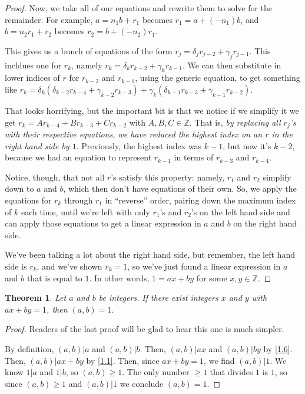\documentclass{article}
\newtheorem{thm}{Theorem}[section]
\numberwithin{equation}{thm}
\begin{document}
\begin{proof}
  Now, we take all of our equations and rewrite them to solve for the remainder. For example, $a = n_1 b + r_1$ becomes $r_1 = a + (-n_1) b$, and $b = n_2 r_1 + r_2$ becomes $r_2 = b + (-n_2) r_1$.

  This gives us a bunch of equations of the form $r_j = \delta_{j} r_{j-2} + \gamma_{j} r_{j-1}$. This incldues one for $r_k$, namely $r_k = \delta_k r_{k-2} + \gamma_k r_{k-1}$.
  We can then substitute in lower indices of $r$ for $r_{k-2}$ and $r_{k-1}$, using the generic equation, to get something like $r_k = \delta_k (\delta_{k-2} r_{k-4} + \gamma_{k-2} r_{k-3}) + \gamma_k (\delta_{k-1} r_{k-3} + \gamma_{k-1} r_{k-2})$.

  That looks horrifying, but the important bit is that we notice if we simplify it we get $r_k = Ar_{k-4} + Br_{k-3} + Cr_{k-2}$ with $A, B, C \in \mathbb{Z}$. That is, \emph{by replacing all $r_j$'s with their respective equations, we have reduced the highest index on an $r$ in the right hand side by $1$}. Previously, the highest index was $k-1$, but now it's $k-2$, because we had an equation to represent $r_{k-1}$ in terms of $r_{k-3}$ and $r_{k-4}$.

  Notice, though, that not all $r$'s satisfy this property: namely, $r_1$ and $r_2$ simplify down to $a$ and $b$, which then don't have equations of their own. So, we apply the equations for $r_k$ through $r_1$ in ``reverse'' order, pairing down the maximum index of $k$ each time, until we're left with only $r_1$'s and $r_2$'s on the left hand side and can apply those equations to get a linear expression in $a$ and $b$ on the right hand side.

  We've been talking a lot about the right hand side, but remember, the left hand side is $r_k$, and we've shown $r_k = 1$, so we've just found a linear expression in $a$ and $b$ that is equal to $1$. In other words, $1 = ax + by$ for some $x, y \in \mathbb{Z}$.
\end{proof}



\begin{thm} \label{1.39}
  Let $a$ and $b$ be integers. If there exist integers $x$ and $y$ with $ax + by = 1$, then $(a, b) = 1$.
\end{thm}

\begin{proof}
  Readers of the last proof will be glad to hear this one is much simpler.

  By definition, $(a, b) | a$ and $(a, b) | b$. Then, $(a, b) | ax$ and $(a, b) | by$ by \ref{1.6}. Then, $(a, b) | ax + by$ by \ref{1.1}. Then, since $ax + by = 1$, we find $(a, b) | 1$. We know $1 | a$ and $1 | b$, so $(a, b) \geq 1$. The only number $\geq 1$ that divides $1$ is $1$, so since $(a, b) \geq 1$ and $(a, b) | 1$ we conclude $(a, b) = 1$.
\end{proof}
\end{document}

